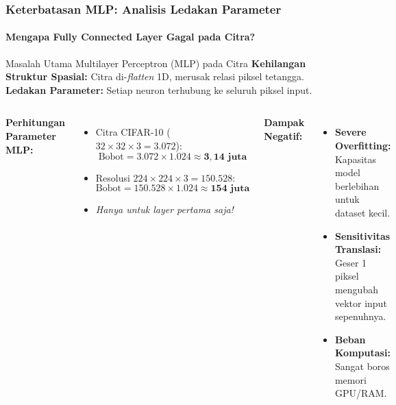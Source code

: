 \documentclass[t,aspectratio=169,xcolor=dvipsnames]{beamer}
\begin{document}
\begin{frame}
    \frametitle{Keterbatasan MLP: Analisis Ledakan Parameter}
    \framesubtitle{Mengapa Fully Connected Layer Gagal pada Citra?}
    \footnotesize

    \begin{alertblock}{Masalah Utama Multilayer Perceptron (MLP) pada Citra}
        \textbf{Kehilangan Struktur Spasial:} Citra di-\textit{flatten} 1D, merusak relasi piksel tetangga. \\
        \textbf{Ledakan Parameter:} Setiap neuron terhubung ke seluruh piksel input.
    \end{alertblock}

    \begin{columns}[t]
        \textbf{Perhitungan Parameter MLP:}
        \begin{itemize}
            \item Citra CIFAR-10 ($32\times32\times3 = 3.072$):
            $$\text{Bobot} = 3.072 \times 1.024 \approx \mathbf{3{,}14\text{ juta}}$$
            \item Resolusi $224\times224\times3 = 150.528$:
            $$\text{Bobot} = 150.528 \times 1.024 \approx \mathbf{154\text{ juta}}$$
            \item \textit{Hanya untuk layer pertama saja!}
        \end{itemize}

        \textbf{Dampak Negatif:}
        \begin{itemize}
            \item \textbf{Severe Overfitting:} Kapasitas model berlebihan untuk dataset kecil.
            \item \textbf{Sensitivitas Translasi:} Geser 1 piksel mengubah vektor input sepenuhnya.
            \item \textbf{Beban Komputasi:} Sangat boros memori GPU/RAM.
        \end{itemize}
    \end{columns}
\end{frame}
\end{document}
